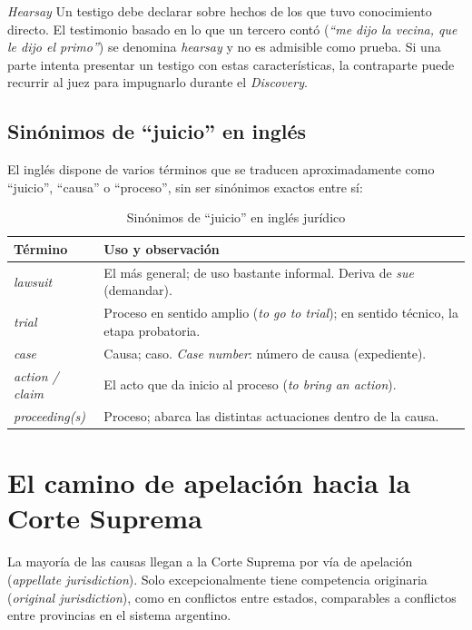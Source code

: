 \documentclass[12pt,oneside]{book}
\begin{document}
\begin{definition}{\textit{Hearsay}}
Un testigo debe declarar sobre hechos de los que tuvo conocimiento directo. El testimonio basado en lo que un tercero contó (\textit{``me dijo la vecina, que le dijo el primo''}) se denomina \textit{hearsay} y no es admisible como prueba. Si una parte intenta presentar un testigo con estas características, la contraparte puede recurrir al juez para impugnarlo durante el \textit{Discovery}.
\end{definition}

\subsection{Sinónimos de ``juicio'' en inglés}

El inglés dispone de varios términos que se traducen aproximadamente como ``juicio'', ``causa'' o ``proceso'', sin ser sinónimos exactos entre sí:

\begin{table}[H]
\centering
\caption{Sinónimos de ``juicio'' en inglés jurídico}
\begin{tabularx}{\textwidth}{>{\raggedright\arraybackslash}p{} >{\raggedright\arraybackslash}X}
\toprule
\textbf{Término} & \textbf{Uso y observación} \\
\midrule
\textit{lawsuit} & El más general; de uso bastante informal. Deriva de \textit{sue} (demandar). \\
\textit{trial} & Proceso en sentido amplio (\textit{to go to trial}); en sentido técnico, la etapa probatoria. \\
\textit{case} & Causa; caso. \textit{Case number}: número de causa (expediente). \\
\textit{action / claim} & El acto que da inicio al proceso (\textit{to bring an action}). \\
\textit{proceeding(s)} & Proceso; abarca las distintas actuaciones dentro de la causa. \\
\bottomrule
\end{tabularx}
\end{table}

\section{El camino de apelación hacia la Corte Suprema}

La mayoría de las causas llegan a la Corte Suprema por vía de apelación (\textit{appellate jurisdiction}). Solo excepcionalmente tiene competencia originaria (\textit{original jurisdiction}), como en conflictos entre estados, comparables a conflictos entre provincias en el sistema argentino.
\end{document}
